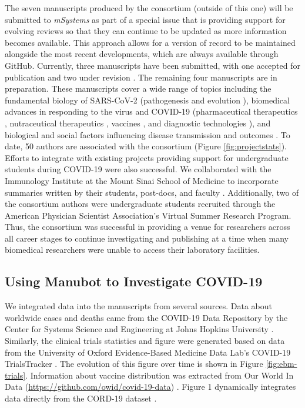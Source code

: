 \documentclass[sigconf]{acmart}
\begin{document}
The seven manuscripts produced by the consortium (outside of this one) will be submitted to \emph{mSystems} as part of a special issue that is providing support for evolving reviews so that they can continue to be updated as more information becomes available.
This approach allows for a version of record to be maintained alongside the most recent developments, which are always available through GitHub.
Currently, three manuscripts have been submitted, with one accepted for publication \citep{1B22G6dja} and two under revision \citep{r366f5T3, cifK9B8t}.
The remaining four manuscripts are in preparation.
These manuscripts cover a wide range of topics including the fundamental biology of SARS-CoV-2 (pathogenesis \citep{r366f5T3} and evolution \citep{17qiILENK}), biomedical advances in responding to the virus and COVID-19 (pharmaceutical therapeutics \citep{cifK9B8t}, nutraceutical therapeutics \citep{1B22G6dja}, vaccines \citep{i2CGFwI3}, and diagnostic technologies \citep{m8bOfc0M}), and biological and social factors influencing disease transmission and outcomes \citep{Up1vB19z}.
To date, 50 authors are associated with the consortium (Figure \ref{fig:projectstats}).
Efforts to integrate with existing projects providing support for undergraduate students during COVID-19 were also successful.
We collaborated with the Immunology Institute at the Mount Sinai School of Medicine to incorporate summaries written by their students, post-docs, and faculty \citep{cYo4O2qX, YZ4cHNuH}.
Additionally, two of the consortium authors were undergraduate students recruited through the American Physician Scientist Association's Virtual Summer Research Program.
Thus, the consortium was successful in providing a venue for researchers across all career stages to continue investigating and publishing at a time when many biomedical researchers were unable to access their laboratory facilities.

\hypertarget{using-manubot-to-investigate-covid-19}{%
\subsection{Using Manubot to Investigate COVID-19}\label{using-manubot-to-investigate-covid-19}}

We integrated data into the manuscripts from several sources.
Data about worldwide cases and deaths came from the COVID-19 Data Repository by the Center for Systems Science and Engineering at Johns Hopkins University \citep{MrwDDw9R}.
Similarly, the clinical trials statistics and figure were generated based on data from the University of Oxford Evidence-Based Medicine Data Lab's COVID-19 TrialsTracker \citep{SSbnPnzT}.
The evolution of this figure over time is shown in Figure \ref{fig:ebm-trials}.
Information about vaccine distribution was extracted from Our World In Data (\url{https://github.com/owid/covid-19-data}) \citep{ZHvhFakW}.
Figure 1 dynamically integrates data directly from the CORD-19 dataset \citep{CiOwklc6}.
\end{document}
